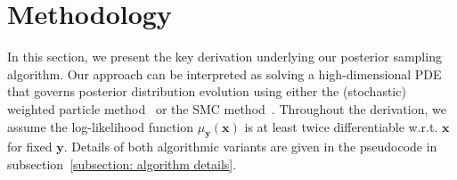 \documentclass{article}
\numberwithin{equation}{section}
\def\vx{{\bm{x}}}
\def\vy{{\bm{y}}}
\begin{document}


\section{Methodology}
\label{sec: main result - algorithms}

In this section, we present the key derivation underlying our posterior sampling algorithm. Our approach can be interpreted as solving a high-dimensional PDE that governs posterior distribution evolution using either the (stochastic) weighted particle method~\cite{degond1989weighted,degond1990deterministic,rjasanow1996stochastic,bossy1997stochastic,talay2003stochastic,raviart2006analysis,chertock2017practical} or the SMC method~\cite{chopin2002sequential,del2006sequential,doucet2009tutorial,del2013mean,moral2004feynman}. Throughout the derivation, we assume the log-likelihood function $\mu_{\vy}(\vx)$ is at least twice differentiable w.r.t. $\vx$ for fixed $\vy$. Details of both algorithmic variants are given in the pseudocode in subsection~\ref{subsection: algorithm details}.
\end{document}

